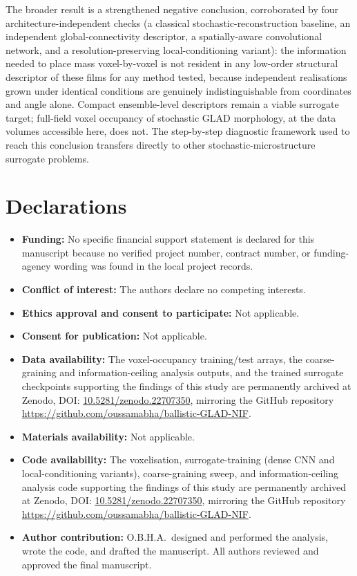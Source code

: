 \documentclass[aip,amsmath,amssymb,reprint]{revtex4-1}
\begin{document}
The broader result is a strengthened negative conclusion, corroborated by four
architecture-independent checks (a classical stochastic-reconstruction
baseline, an independent global-connectivity descriptor, a spatially-aware
convolutional network, and a resolution-preserving local-conditioning variant):
the information needed to place mass voxel-by-voxel is not resident in any
low-order structural descriptor of these films for any method tested, because
independent realisations grown under identical conditions are genuinely
indistinguishable from coordinates and angle alone. Compact ensemble-level
descriptors remain a viable surrogate target; full-field voxel occupancy of
stochastic GLAD morphology, at the data volumes accessible here, does not. The
step-by-step diagnostic framework used to reach this conclusion transfers
directly to other stochastic-microstructure surrogate problems.

\section*{Declarations}

\begin{itemize}
\item \textbf{Funding:} No specific financial support statement is declared
  for this manuscript because no verified project number, contract number, or
  funding-agency wording was found in the local project records.
\item \textbf{Conflict of interest:} The authors declare no competing interests.
\item \textbf{Ethics approval and consent to participate:} Not applicable.
\item \textbf{Consent for publication:} Not applicable.
\item \textbf{Data availability:} The voxel-occupancy training/test arrays,
  the coarse-graining and information-ceiling analysis outputs, and the
  trained surrogate checkpoints supporting the findings of this study are
  permanently archived at Zenodo, DOI: \href{https://doi.org/10.5281/zenodo.22707350}{10.5281/zenodo.22707350}, mirroring
  the GitHub repository \url{https://github.com/oussamabha/ballistic-GLAD-NIF}.
\item \textbf{Materials availability:} Not applicable.
\item \textbf{Code availability:} The voxelisation, surrogate-training
  (dense CNN and local-conditioning variants), coarse-graining sweep, and
  information-ceiling analysis code supporting the findings of this study
  are permanently archived at Zenodo, DOI: \href{https://doi.org/10.5281/zenodo.22707350}{10.5281/zenodo.22707350},
  mirroring the GitHub repository \url{https://github.com/oussamabha/ballistic-GLAD-NIF}.
\item \textbf{Author contribution:} O.B.H.A.\ designed and performed the
  analysis, wrote the code, and drafted the manuscript. All authors reviewed
  and approved the final manuscript.
\end{itemize}
\end{document}
